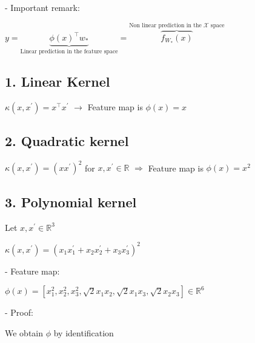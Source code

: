 - Important remark:

$y=\underbrace{\phi(x)^\top w_*}_{\text{Linear prediction in the feature space}}=\overbrace{f_{W_*}(x)}^{\text{Non linear prediction in the $\mathcal{X}$ space}}$

\subsection*{1. Linear Kernel}

$\kappa\left(x, x^{\prime}\right)=x^{\top} x^{\prime}$ $\rightarrow$ Feature map is $\phi(x)=x$

\subsection*{2. Quadratic kernel}

$\kappa\left(x, x^{\prime}\right)=\left(x x^{\prime}\right)^{2}$ for $x, x^{\prime} \in \mathbb{R}$ $\Rightarrow$ Feature map is $\phi(x)=x^{2}$

\subsection*{3. Polynomial kernel}
Let $x, x^{\prime} \in \mathbb{R}^{3}$

$
\kappa\left(x, x^{\prime}\right)=\left(x_{1} x_{1}^{\prime}+x_{2} x_{2}^{\prime}+x_{3} x_{3}^{\prime}\right)^{2}
$

- Feature map:

$
\phi(x)=\left[x_{1}^{2}, x_{2}^{2}, x_{3}^{2}, \sqrt{2} x_{1} x_{2}, \sqrt{2} x_{1} x_{3}, \sqrt{2} x_{2} x_{3}\right] \in \mathbb{R}^{6}
$

- Proof:

We obtain $\phi$ by identification


